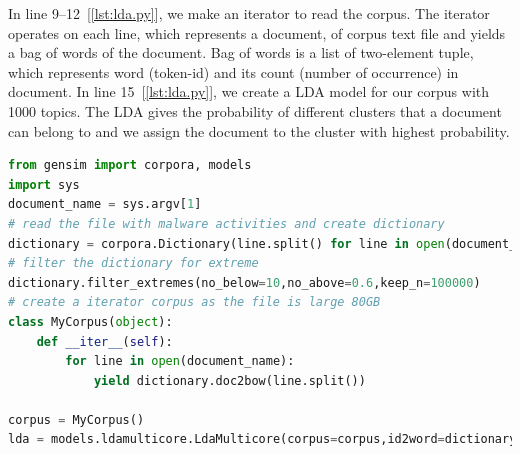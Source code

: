 In line 9--12~[\autoref{lst:lda.py}], we make an iterator to read the corpus.
The iterator operates on each line, which represents a document, of corpus text file and yields a bag of words of the document.
Bag of words is a list of two-element tuple, which represents word (token-id) and its count (number of occurrence) in document.
In line 15~[\autoref{lst:lda.py}], we create a LDA model for our corpus with 1000 topics.
The LDA gives the probability of different clusters that a document can belong to and we assign the document to the cluster with highest probability.\\
\begin{lstlisting}[float,floatplacement=H,language=python,caption={Script to run Gensim LDA},label={lst:lda.py}]
from gensim import corpora, models
import sys
document_name = sys.argv[1]
# read the file with malware activities and create dictionary
dictionary = corpora.Dictionary(line.split() for line in open(document_name))
# filter the dictionary for extreme
dictionary.filter_extremes(no_below=10,no_above=0.6,keep_n=100000)
# create a iterator corpus as the file is large 80GB
class MyCorpus(object):
    def __iter__(self):
        for line in open(document_name):
            yield dictionary.doc2bow(line.split())

corpus = MyCorpus()
lda = models.ldamulticore.LdaMulticore(corpus=corpus,id2word=dictionary,num_topics=1000)
\end{lstlisting}


